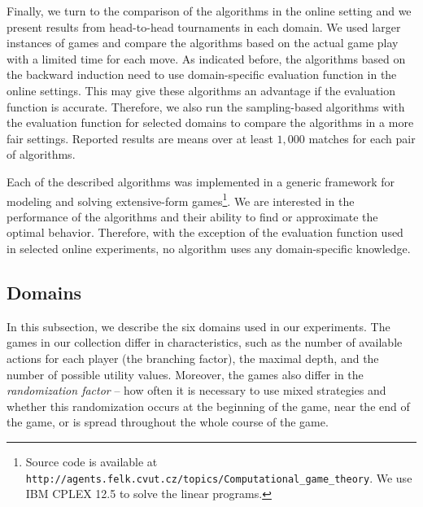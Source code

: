 Finally, we turn to the comparison of the algorithms in the online setting and we present results from head-to-head tournaments in each domain.
We used larger instances of games and compare the algorithms based on the actual game play with a limited time for each move. 
As indicated before, the algorithms based on the backward induction need to use domain-specific evaluation function in the online settings.
This may give these algorithms an advantage if the evaluation function is accurate.
Therefore, we also run the sampling-based algorithms with the evaluation function for selected domains to compare the algorithms in a more fair settings.
Reported results are means over at least $1,000$ matches for each pair of algorithms.

Each of the described algorithms was implemented in a generic framework for modeling and solving extensive-form games\footnote{Source code is available at \texttt{http://agents.felk.cvut.cz/topics/Computational\_\newline game\_theory}. We use IBM CPLEX 12.5 to solve the linear programs.}.
We are interested in the performance of the algorithms and their ability to find or approximate the optimal behavior.
Therefore, with the exception of the evaluation function used in selected online experiments, no algorithm uses any domain-specific knowledge.


\subsection{Domains}\label{sec:eval:domains}

In this subsection, we describe the six domains used in our experiments.
The games in our collection differ in characteristics, such as the number of available actions for each player (\ie the branching factor), the maximal depth, and the number of possible utility values.
Moreover, the games also differ in the \emph{randomization factor} -- \ie how often it is necessary to use mixed strategies and whether this randomization occurs at the beginning of the game, near the end of the game, or is spread throughout the whole course of the game.


